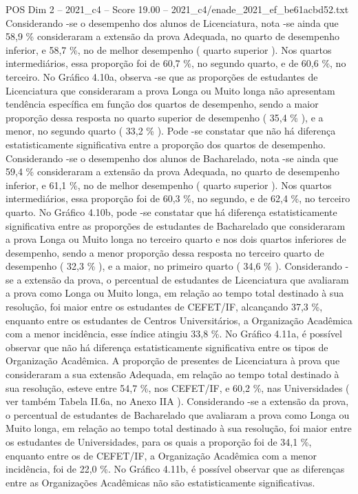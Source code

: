 \begin{textsample}{POS Dim 2 – 2021\_c4 – Score 19.00 – 2021\_c4/enade\_2021\_ef\_be61acbd52.txt}
Considerando -se o desempenho dos alunos de Licenciatura, nota -se ainda que 58,9 \% consideraram a extensão da prova Adequada, no quarto de desempenho inferior, e 58,7 \%, no de melhor desempenho ( quarto superior ).
Nos quartos intermediários, essa proporção foi de 60,7 \%, no segundo quarto, e de 60,6 \%, no terceiro.
No Gráfico 4.10a, observa -se que as proporções de estudantes de Licenciatura que consideraram a prova Longa ou Muito longa não apresentam tendência específica em função dos quartos de desempenho, sendo a maior proporção dessa resposta no quarto superior de desempenho ( 35,4 \% ), e a menor, no segundo quarto ( 33,2 \% ).
Pode -se constatar que não há diferença estatisticamente significativa entre a proporção dos quartos de desempenho.
Considerando -se o desempenho dos alunos de Bacharelado, nota -se ainda que 59,4 \% consideraram a extensão da prova Adequada, no quarto de desempenho inferior, e 61,1 \%, no de melhor desempenho ( quarto superior ).
Nos quartos intermediários, essa proporção foi de 60,3 \%, no segundo, e de 62,4 \%, no terceiro quarto.
No Gráfico 4.10b, pode -se constatar que há diferença estatisticamente significativa entre as proporções de estudantes de Bacharelado que consideraram a prova Longa ou Muito longa no terceiro quarto e nos dois quartos inferiores de desempenho, sendo a menor proporção dessa resposta no terceiro quarto de desempenho ( 32,3 \% ), e a maior, no primeiro quarto ( 34,6 \% ).
Considerando -se a extensão da prova, o percentual de estudantes de Licenciatura que avaliaram a prova como Longa ou Muito longa, em relação ao tempo total destinado à sua resolução, foi maior entre os estudantes de CEFET/IF, alcançando 37,3 \%, enquanto entre os estudantes de Centros Universitários, a Organização Acadêmica com a menor incidência, esse índice atingiu 33,8 \%.
No Gráfico 4.11a, é possível observar que não há diferença estatisticamente significativa entre os tipos de Organização Acadêmica.
A proporção de presentes de Licenciatura à prova que consideraram a sua extensão Adequada, em relação ao tempo total destinado à sua resolução, esteve entre 54,7 \%, nos CEFET/IF, e 60,2 \%, nas Universidades ( ver também Tabela II.6a, no Anexo IIA ).
Considerando -se a extensão da prova, o percentual de estudantes de Bacharelado que avaliaram a prova como Longa ou Muito longa, em relação ao tempo total destinado à sua resolução, foi maior entre os estudantes de Universidades, para os quais a proporção foi de 34,1 \%, enquanto entre os de CEFET/IF, a Organização Acadêmica com a menor incidência, foi de 22,0 \%.
No Gráfico 4.11b, é possível observar que as diferenças entre as Organizações Acadêmicas não são estatisticamente significativas.

\end{textsample}
